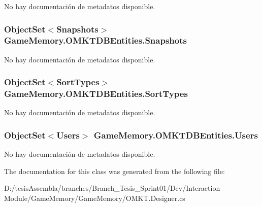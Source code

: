No hay documentación de metadatos disponible. 

\hypertarget{class_game_memory_1_1_o_m_k_t_d_b_entities_a92994523a68924f73a56573bef2c30a1}{
\subsubsection[{Snapshots}]{\setlength{\rightskip}{0pt plus 5cm}Object\-Set$<${\bf Snapshots}$>$ Game\-Memory.\-O\-M\-K\-T\-D\-B\-Entities.\-Snapshots\hspace{0.3cm}{\ttfamily [get]}}}\label{class_game_memory_1_1_o_m_k_t_d_b_entities_a92994523a68924f73a56573bef2c30a1}


No hay documentación de metadatos disponible. 

\hypertarget{class_game_memory_1_1_o_m_k_t_d_b_entities_a0492961a574d534922759ef30d8e1ca4}{
\subsubsection[{Sort\-Types}]{\setlength{\rightskip}{0pt plus 5cm}Object\-Set$<${\bf Sort\-Types}$>$ Game\-Memory.\-O\-M\-K\-T\-D\-B\-Entities.\-Sort\-Types\hspace{0.3cm}{\ttfamily [get]}}}\label{class_game_memory_1_1_o_m_k_t_d_b_entities_a0492961a574d534922759ef30d8e1ca4}


No hay documentación de metadatos disponible. 

\hypertarget{class_game_memory_1_1_o_m_k_t_d_b_entities_a94089f227ee6993ee595a21060f55384}{
\subsubsection[{Users}]{\setlength{\rightskip}{0pt plus 5cm}Object\-Set$<${\bf Users}$>$ Game\-Memory.\-O\-M\-K\-T\-D\-B\-Entities.\-Users\hspace{0.3cm}{\ttfamily [get]}}}\label{class_game_memory_1_1_o_m_k_t_d_b_entities_a94089f227ee6993ee595a21060f55384}


No hay documentación de metadatos disponible. 



The documentation for this class was generated from the following file\-:\begin{DoxyCompactItemize}
\item 
D\-:/tesis\-Assembla/branches/\-Branch\-\_\-\-Tesis\-\_\-\-Sprint01/\-Dev/\-Interaction Module/\-Game\-Memory/\-Game\-Memory/O\-M\-K\-T.\-Designer.\-cs\end{DoxyCompactItemize}

